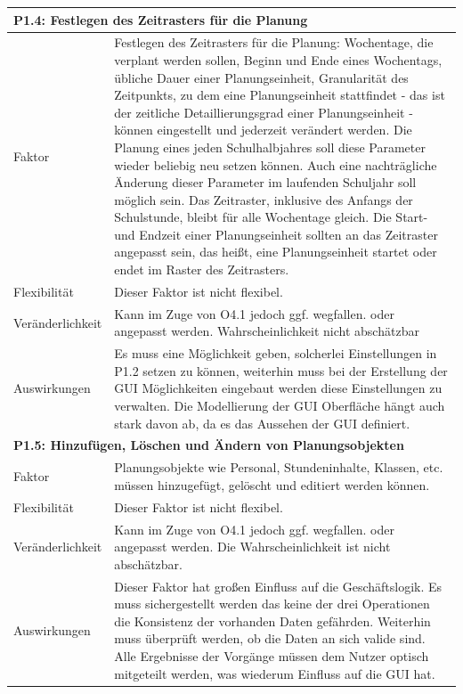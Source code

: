 \documentclass[fontsize=12pt,paper=a4,twoside]{scrartcl}
\begin{document}
\begin{tabularx}{\textwidth}{|l|X|}
\hline
\multicolumn{2}{|l|}{\textbf{P1.4: Festlegen des Zeitrasters für die Planung}}\\\hline
Faktor & Festlegen des Zeitrasters für die Planung: Wochentage, die verplant werden sollen, Beginn und Ende eines Wochentags, übliche Dauer einer Planungseinheit, Granularität des Zeitpunkts, zu dem eine Planungseinheit stattfindet - das ist der zeitliche Detaillierungsgrad einer Planungseinheit - können eingestellt und jederzeit verändert werden. Die Planung eines jeden Schulhalbjahres soll diese Parameter wieder beliebig neu setzen können. Auch eine nachträgliche Änderung dieser Parameter im laufenden Schuljahr soll möglich sein. Das Zeitraster, inklusive des Anfangs der Schulstunde, bleibt für alle Wochentage gleich. Die Start- und Endzeit einer Planungseinheit sollten an das Zeitraster angepasst sein, das heißt, eine Planungseinheit startet oder endet im Raster des Zeitrasters.  \\\hline
Flexibilität & Dieser Faktor ist nicht flexibel. \\\hline
Veränderlichkeit & Kann im Zuge von O4.1 jedoch ggf. wegfallen. oder angepasst werden.  Wahrscheinlichkeit nicht abschätzbar \\\hline
Auswirkungen &  Es muss eine Möglichkeit geben, solcherlei Einstellungen in P1.2 setzen zu können, weiterhin muss bei der Erstellung der GUI Möglichkeiten eingebaut werden diese Einstellungen zu verwalten. Die Modellierung der GUI Oberfläche hängt auch stark davon ab, da es das Aussehen der GUI definiert. \\\hline
\multicolumn{2}{|l|}{\textbf{P1.5: Hinzufügen, Löschen und Ändern von Planungsobjekten}}\\\hline
Faktor & Planungsobjekte wie Personal, Stundeninhalte, Klassen, etc. müssen hinzugefügt, gelöscht und editiert werden können. \\\hline
Flexibilität & Dieser Faktor ist nicht flexibel. \\\hline
Veränderlichkeit & Kann im Zuge von O4.1 jedoch ggf. wegfallen. oder angepasst werden.  Die Wahrscheinlichkeit ist nicht abschätzbar. \\\hline
Auswirkungen &  Dieser Faktor hat großen Einfluss auf die Geschäftslogik. Es muss sichergestellt werden das keine der drei Operationen die Konsistenz der vorhanden Daten gefährden. Weiterhin muss überprüft werden, ob die Daten an sich valide sind. Alle Ergebnisse der Vorgänge müssen dem Nutzer optisch mitgeteilt werden, was wiederum Einfluss auf die GUI hat. \\\hline
\end{tabularx} \newpage
\end{document}
